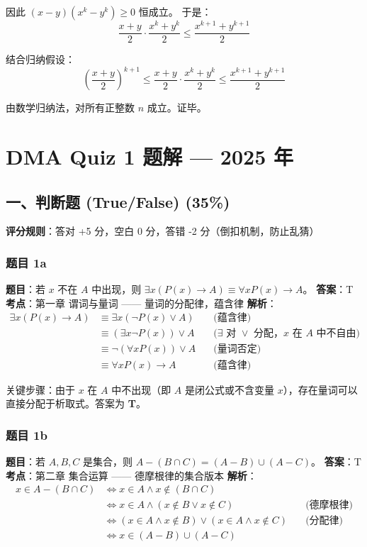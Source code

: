 \documentclass[10pt,a4paper,openany]{ctexbook}
\theoremstyle{definition}
\theoremstyle{remark}
\begin{document}
因此 $(x - y)(x^k - y^k) \ge 0$ 恒成立。
于是：
\[
\frac{x + y}{2} \cdot \frac{x^k + y^k}{2} \le \frac{x^{k+1} + y^{k+1}}{2}
\]

结合归纳假设：
\[
\left(\frac{x + y}{2}\right)^{k+1} \le \frac{x + y}{2} \cdot \frac{x^k + y^k}{2} \le \frac{x^{k+1} + y^{k+1}}{2}
\]

由数学归纳法，对所有正整数 $n$ 成立。证毕。


\section{DMA Quiz 1 题解 — 2025 年}

\subsection{一、判断题 (True/False) (35\%)}

\textbf{评分规则}：答对 +5 分，空白 0 分，答错 -2 分（倒扣机制，防止乱猜）
\subsubsection{题目 1a}

\textbf{题目}：若 $x$ 不在 $A$ 中出现，则 $\exists x(P(x) \to A) \equiv \forall x P(x) \to A$。
\textbf{答案}：T
\textbf{考点}：第一章 谓词与量词 —— 量词的分配律，蕴含律
\textbf{解析}：
\[
\begin{aligned}
\exists x(P(x) \to A) &\equiv \exists x(\neg P(x) \lor A) \quad &\text{(蕴含律)}\\
&\equiv (\exists x \neg P(x)) \lor A \quad &\text{(}\exists\text{ 对 }\lor\text{ 分配，}x\text{ 在 }A\text{ 中不自由)}\\
&\equiv \neg(\forall x P(x)) \lor A \quad &\text{(量词否定)}\\
&\equiv \forall x P(x) \to A \quad &\text{(蕴含律)}
\end{aligned}
\]

关键步骤：由于 $x$ 在 $A$ 中不出现（即 $A$ 是闭公式或不含变量 $x$），存在量词可以直接分配于析取式。答案为 \textbf{T}。
\vspace{-2pt}

\subsubsection{题目 1b}

\textbf{题目}：若 $A, B, C$ 是集合，则 $A - (B \cap C) = (A - B) \cup (A - C)$。
\textbf{答案}：T
\textbf{考点}：第二章 集合运算 —— 德摩根律的集合版本
\textbf{解析}：
\[
\begin{aligned}
x \in A - (B \cap C) &\iff x \in A \land x \notin (B \cap C) \\
&\iff x \in A \land (x \notin B \lor x \notin C) \quad &\text{(德摩根律)}\\
&\iff (x \in A \land x \notin B) \lor (x \in A \land x \notin C) \quad &\text{(分配律)}\\
&\iff x \in (A - B) \cup (A - C)
\end{aligned}
\]
\end{document}
